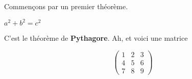 


	
	Commençons par un premier théorème.
	
	\begin{theorem}[Pythagore]
		$a^2+b^2=c^2$
	\end{theorem}
	
	C'est le théorème de \textbf{Pythagore}. Ah, et voici une matrice
	
	\[ \begin{pmatrix}
		1 & 2 & 3 \\
		4 & 5 & 6 \\
		7 & 8 & 9
	\end{pmatrix} \]
